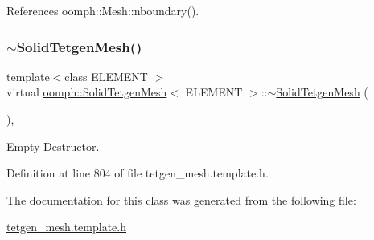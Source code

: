 References oomph\+::\+Mesh\+::nboundary().

\mbox{\label{classoomph_1_1SolidTetgenMesh_afbd361be70e8d0f585a63cc300a26af7}} 
\subsubsection{\texorpdfstring{$\sim$\+Solid\+Tetgen\+Mesh()}{~SolidTetgenMesh()}}
{\footnotesize\ttfamily template$<$class E\+L\+E\+M\+E\+NT $>$ \\
virtual \hyperlink{classoomph_1_1SolidTetgenMesh}{oomph\+::\+Solid\+Tetgen\+Mesh}$<$ E\+L\+E\+M\+E\+NT $>$\+::$\sim$\hyperlink{classoomph_1_1SolidTetgenMesh}{Solid\+Tetgen\+Mesh} (\begin{DoxyParamCaption}{ }\end{DoxyParamCaption})\hspace{0.3cm}{\ttfamily [inline]}, {\ttfamily [virtual]}}



Empty Destructor. 



Definition at line 804 of file tetgen\+\_\+mesh.\+template.\+h.



The documentation for this class was generated from the following file\+:\begin{DoxyCompactItemize}
\item 
\hyperlink{tetgen__mesh_8template_8h}{tetgen\+\_\+mesh.\+template.\+h}\end{DoxyCompactItemize}
